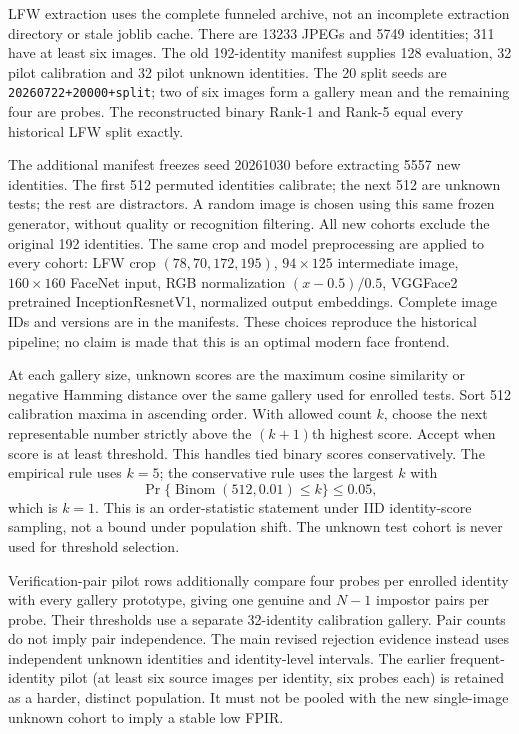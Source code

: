 \documentclass[journal,onecolumn]{IEEEtran}
\begin{document}
LFW extraction uses the complete funneled archive, not an incomplete extraction directory or stale joblib cache. There are 13233 JPEGs and 5749 identities; 311 have at least six images. The old 192-identity manifest supplies 128 evaluation, 32 pilot calibration and 32 pilot unknown identities. The 20 split seeds are \texttt{20260722+20000+split}; two of six images form a gallery mean and the remaining four are probes. The reconstructed binary Rank-1 and Rank-5 equal every historical LFW split exactly.

The additional manifest freezes seed 20261030 before extracting 5557 new identities. The first 512 permuted identities calibrate; the next 512 are unknown tests; the rest are distractors. A random image is chosen using this same frozen generator, without quality or recognition filtering. All new cohorts exclude the original 192 identities. The same crop and model preprocessing are applied to every cohort: LFW crop $(78,70,172,195)$, $94\times125$ intermediate image, $160\times160$ FaceNet input, RGB normalization $(x-0.5)/0.5$, VGGFace2 pretrained InceptionResnetV1, normalized output embeddings. Complete image IDs and versions are in the manifests. These choices reproduce the historical pipeline; no claim is made that this is an optimal modern face frontend.

At each gallery size, unknown scores are the maximum cosine similarity or negative Hamming distance over the same gallery used for enrolled tests. Sort 512 calibration maxima in ascending order. With allowed count $k$, choose the next representable number strictly above the $(k+1)$th highest score. Accept when score is at least threshold. This handles tied binary scores conservatively. The empirical rule uses $k=5$; the conservative rule uses the largest $k$ with
\[
\Pr\{\operatorname{Binom}(512,0.01)\le k\}\le0.05,
\]
which is $k=1$. This is an order-statistic statement under IID identity-score sampling, not a bound under population shift. The unknown test cohort is never used for threshold selection.

Verification-pair pilot rows additionally compare four probes per enrolled identity with every gallery prototype, giving one genuine and $N-1$ impostor pairs per probe. Their thresholds use a separate 32-identity calibration gallery. Pair counts do not imply pair independence. The main revised rejection evidence instead uses independent unknown identities and identity-level intervals. The earlier frequent-identity pilot (at least six source images per identity, six probes each) is retained as a harder, distinct population. It must not be pooled with the new single-image unknown cohort to imply a stable low FPIR.
\end{document}
